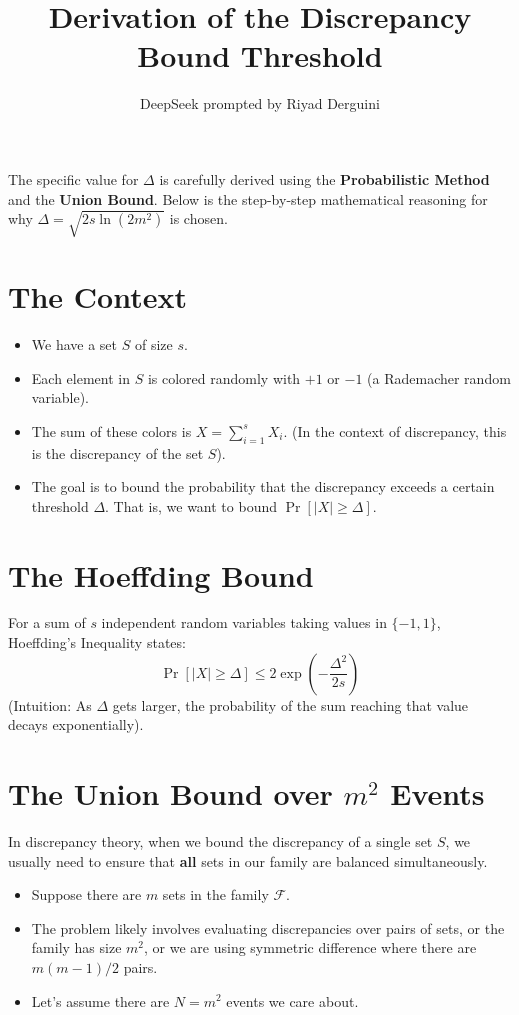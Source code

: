 \documentclass[11pt]{article}
\title{Derivation of the Discrepancy Bound Threshold}
\author{DeepSeek prompted by Riyad Derguini}
\date{}
\begin{document}
\maketitle

The specific value for \(\Delta\) is carefully derived using the \textbf{Probabilistic Method} and the \textbf{Union Bound}. Below is the step-by-step mathematical reasoning for why \(\Delta = \sqrt{2s \ln(2m^2)}\) is chosen.

\section{The Context}
\begin{itemize}
    \item We have a set \(S\) of size \(s\).
    \item Each element in \(S\) is colored randomly with \(+1\) or \(-1\) (a Rademacher random variable).
    \item The sum of these colors is \(X = \sum_{i=1}^s X_i\). (In the context of discrepancy, this is the discrepancy of the set \(S\)).
    \item The goal is to bound the probability that the discrepancy exceeds a certain threshold \(\Delta\). That is, we want to bound \(\Pr[|X| \ge \Delta]\).
\end{itemize}

\section{The Hoeffding Bound}
For a sum of \(s\) independent random variables taking values in \(\{-1, 1\}\), Hoeffding's Inequality states:
\[
 \Pr[|X| \ge \Delta] \le 2 \exp\left( -\frac{\Delta^2}{2s} \right) 
\]
(Intuition: As \(\Delta\) gets larger, the probability of the sum reaching that value decays exponentially).

\section{The Union Bound over \(m^2\) Events}
In discrepancy theory, when we bound the discrepancy of a single set \(S\), we usually need to ensure that \textbf{all} sets in our family are balanced simultaneously.

\begin{itemize}
    \item Suppose there are \(m\) sets in the family \(\mathcal{F}\). 
    \item The problem likely involves evaluating discrepancies over pairs of sets, or the family has size \(m^2\), or we are using symmetric difference where there are \(m(m-1)/2\) pairs. 
    \item Let's assume there are \(N = m^2\) events we care about. 
\end{itemize}
\end{document}

